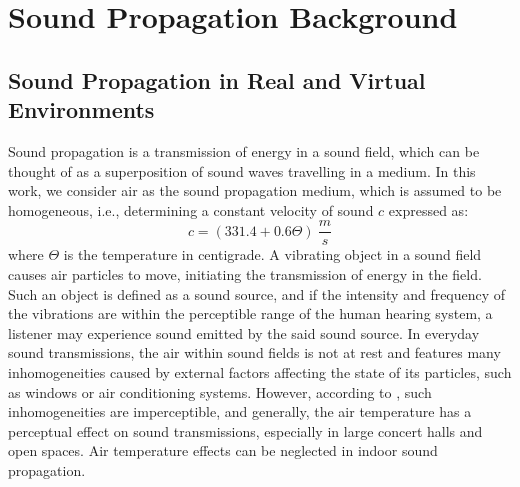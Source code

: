 \section{Sound Propagation Background}
\subsection{Sound Propagation in Real and Virtual Environments}
Sound propagation is a transmission of energy in a sound field, which can be thought of as a superposition of sound waves travelling in a medium. In this work, we consider air as the sound propagation medium, which is assumed to be homogeneous, i.e., determining a constant velocity of sound $c$ expressed as: 
\begin{equation}
c = (331.4 + 0.6\Theta)~\frac{m}{s}   
\end{equation}
where $\Theta$ is the temperature in centigrade.
A vibrating object in a sound field causes air particles to move, initiating the transmission of energy in the field. Such an object is defined as a sound source, and if the intensity and frequency of the vibrations are within the perceptible range of the human hearing system, a listener may experience sound emitted by the said sound source.
In everyday sound transmissions, the air within sound fields is not at rest and features many inhomogeneities caused by external factors affecting the state of its particles, such as windows or air conditioning systems. However, according to \citep{kuttruff2016room}, such inhomogeneities are imperceptible, and generally, the air temperature has a perceptual effect on sound transmissions, especially in large concert halls and open spaces. Air temperature effects can be neglected in indoor sound propagation.

